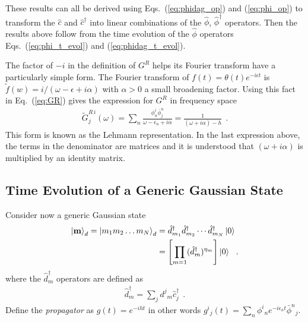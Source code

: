 \documentclass[aps, superscriptaddress, floatfix, onecolumn]{revtex4-2}
\begin{document}
These results can all be derived using Eqs.~(\ref{eq:phidag_op}) and (\ref{eq:phi_op}) to transform the $\hat{c}$ and $\hat{c}^\dagger$ into linear combinations of the $\hat{\phi}$, $\hat{\phi}^\dagger$ operators. Then the results above follow from the time evolution of the $\hat{\phi}$ operators Eqs.~(\ref{eq:phi_t_evol}) and (\ref{eq:phidag_t_evol}).

The factor of $-i$ in the definition of $G^R$ helps its Fourier transform have a particularly simple form. The Fourier transform of $f(t) = \theta(t) e^{-i \epsilon t}$ is $\tilde{f}(w) = i/(\omega - \epsilon + i \alpha)$ with $\alpha > 0$ a small broadening factor. Using this fact in Eq.~(\ref{eq:GR}) gives the expression for $G^R$ in frequency space
\begin{align}
\boxed{ \tilde{G}^{R\, i}_j(\omega)  = \sum_n \frac{\phi^i_n \bar{\phi}_j^n}{\omega - \epsilon_n + i \alpha} = \frac{1}{(\omega + i \alpha) - h } } \ \ .
\end{align}
This form is known as the Lehmann representation. In the last expression above, the terms in the denominator are matrices and it is understood that $(\omega + i \alpha)$ is multiplied by an identity matrix.


\subsection{Time Evolution of a Generic Gaussian State}

Consider now a generic Gaussian state
\begin{align}
\ket{\mathbf{m}}_d = \ket{m_1 m_2 \ldots m_{N}}_d & = \hat{d}^\dagger_{m_1} \hat{d}^\dagger_{m_2} \cdots \hat{d}^\dagger_{m_{N}} \ket{0} \\
& = \left[ \prod_{m=1} (\hat{d}^\dagger_{m})^{\eta_m} \right] \ket{0} \ \ .
\end{align}
where the $\hat{d}^\dagger_m$ operators are defined as
\begin{align}
\hat{d}^\dagger_m = \sum_j d^j\!_m \hat{c}^\dagger_j \ \ . \label{eq:ddag_c_transform}
\end{align}
Define the \emph{propagator} as $\boxed{g(t) = e^{- i h t}}$ in other words $\boxed{g^i\!_j(t) = \sum_n \phi^i\!_n e^{-i \epsilon_n t} \bar{\phi}^n\!_j}$.
\end{document}
